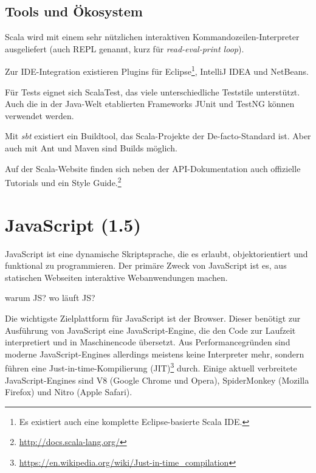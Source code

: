 \documentclass[a4paper, 12pt, hidelinks, listof=totoc, listoftables=totoc, bibliography=totoc]{scrreprt}
\begin{document}
\subsection{Tools und Ökosystem}

Scala wird mit einem sehr nützlichen interaktiven Kommandozeilen-Interpreter ausgeliefert (auch REPL genannt, kurz für \textit{read-eval-print loop}).

Zur IDE-Integration existieren Plugins für Eclipse\footnote{Es existiert auch eine komplette Eclipse-basierte Scala IDE.}, IntelliJ IDEA und NetBeans.

Für Tests eignet sich ScalaTest, das viele unterschiedliche Teststile unterstützt. Auch die in der Java-Welt etablierten Frameworks JUnit und TestNG können verwendet werden.

Mit \textit{sbt} existiert ein Buildtool, das Scala-Projekte der De-facto-Standard ist. Aber auch mit Ant und Maven sind Builds möglich.

Auf der Scala-Website finden sich neben der API-Dokumentation auch offizielle Tutorials und ein Style Guide.\footnote{\url{http://docs.scala-lang.org/}}



\section{JavaScript (1.5)}

JavaScript ist eine dynamische Skriptsprache, die es erlaubt, objektorientiert und funktional zu programmieren. Der primäre Zweck von JavaScript ist es, aus statischen Webseiten interaktive Webanwendungen machen\cite[S. 361]{flanagan2011.JDG}.

warum JS?
wo läuft JS?


Die wichtigste Zielplattform für JavaScript ist der Browser. Dieser benötigt zur Ausführung von JavaScript eine JavaScript-Engine, die den Code zur Laufzeit interpretiert und in Maschinencode übersetzt. Aus Performancegründen sind moderne JavaScript-Engines allerdings meistens keine Interpreter mehr, sondern führen eine Just-in-time-Kompilierung (JIT)\footnote{\url{https://en.wikipedia.org/wiki/Just-in-time_compilation}} durch. Einige aktuell verbreitete JavaScript-Engines sind V8 (Google Chrome und Opera), SpiderMonkey (Mozilla Firefox) und Nitro (Apple Safari).


\end{document}
